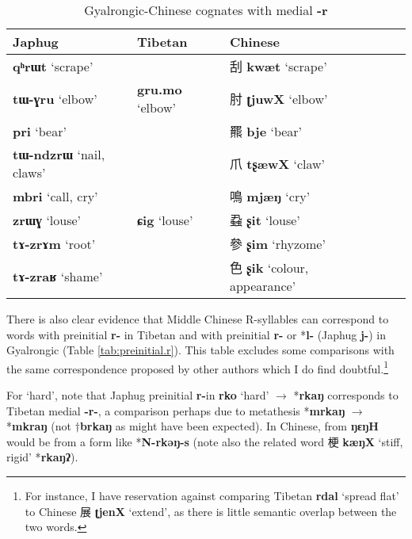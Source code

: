 \documentclass[oneside,a4paper,11pt]{article}
\newcommand{\ipa}[1]{{\phon\mbox{\textbf{#1}}}}
\newcommand{\zh}[1]{{\cn #1}}
\newcommand{\ch}[3]{\zh{#1} \ipa{#2} `#3'}
\begin{document}
\begin{table}
\caption{Gyalrongic-Chinese cognates with medial \ipa{-r}} \label{tab:mid.r} \centering
\begin{tabular}{llllll}
\toprule
Japhug & Tibetan & Chinese \\
\midrule
\ipa{qʰrɯt} `scrape' &&\ch{刮}{kwæt}{scrape} \\
\ipa{tɯ-ɣru} `elbow' &\ipa{gru.mo} `elbow' &\ch{肘}{ʈjuwX}{elbow}\\
\ipa{pri} `bear'&& \ch{羆}{bje}{bear} \\
\ipa{tɯ-ndzrɯ} `nail, claws' &&\ch{爪}{tʂæwX}{claw}\\
\ipa{mbri} `call, cry'&& \ch{鳴}{mjæŋ}{cry}\\
\ipa{zrɯɣ} `louse'&\ipa{ɕig} `louse'& \ch{蝨}{ʂit}{louse} \\
\ipa{tɤ-zrɤm} `root' &&\ch{參}{ʂim}{rhyzome}\\
\ipa{tɤ-zraʁ}  `shame' && \ch{色}{ʂik}{colour, appearance}\\
\bottomrule
\end{tabular}
\end{table}

There is also clear evidence that Middle Chinese R-syllables can correspond to words with preinitial \ipa{r-} in Tibetan and with preinitial \ipa{r-} or *\ipa{l-} (Japhug \ipa{j-}) in Gyalrongic (Table \ref{tab:preinitial.r}). This table excludes some comparisons with the same correspondence proposed by other authors which I do find doubtful.\footnote{For instance, I have reservation against comparing Tibetan \ipa{rdal} `spread flat' to Chinese \ch{展}{ʈjenX}{extend}, as there is little semantic overlap between the two words.}

For `hard', note that Japhug preinitial \ipa{r-}in \ipa{rko} `hard' $\rightarrow$  *\ipa{rkaŋ} corresponds to Tibetan medial \ipa{-r-}, a comparison perhaps due to metathesis *\ipa{mrkaŋ} $\rightarrow$ *\ipa{mkraŋ} (not $\dagger$\ipa{brkaŋ} as might have been expected). In Chinese, from \ipa{ŋɛŋH} would be from a form like *\ipa{N-rkəŋ-s} (note also the related word \ch{梗}{kæŋX}{stiff, rigid} *\ipa{rkaŋʔ}).
\end{document}
